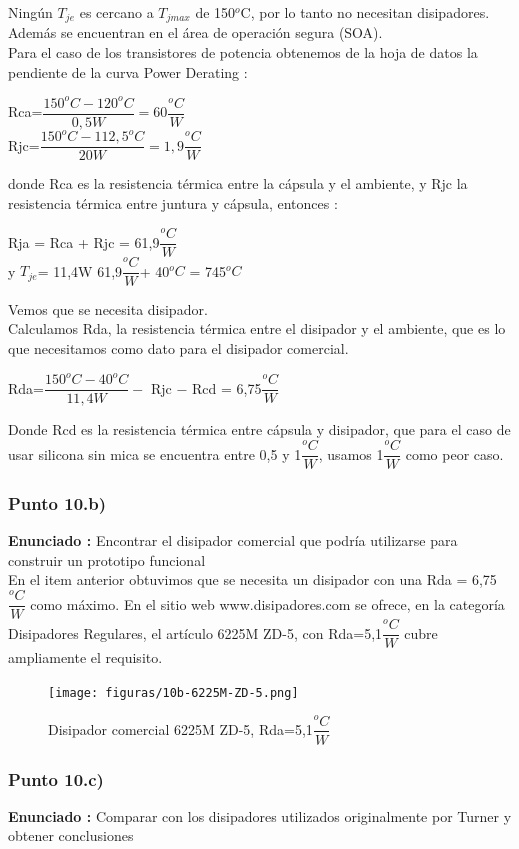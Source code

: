 \documentclass[12pt]{book}
\begin{document}
Ningún $T_{je}$ es cercano a $T_{jmax}$ de 150$^{o}$C, por lo tanto no necesitan disipadores. Además se encuentran en el área de operación segura (SOA).\\
Para el caso de los transistores de potencia obtenemos de la hoja de datos la pendiente de la curva Power Derating :
\begin{center}
Rca=$\dfrac{150^{o}C-120^{o}C}{0,5W}=60\dfrac{^{o}C}{W}$\\
Rjc=$\dfrac{150^{o}C-112,5^{o}C}{20W}=1,9\dfrac{^{o}C}{W}$
\end{center}
donde Rca es la resistencia térmica entre la cápsula y el ambiente, y Rjc la resistencia térmica entre juntura y cápsula, entonces :
\begin{center}
Rja = Rca + Rjc = 61,9$\dfrac{^{o}C}{W}$\\
y $T_{je}$= 11,4W 61,9$\dfrac{^{o}C}{W}$+ 40$^{o}C$ = 745$^{o}C$
\end{center}
Vemos que se necesita disipador.\\
Calculamos Rda, la resistencia térmica entre el disipador y el ambiente, que es lo que necesitamos como dato para el disipador comercial.
\begin{center}
Rda=$\dfrac{150^{o}C-40^{o}C}{11,4W}-$ Rjc $-$ Rcd = 6,75$\dfrac{^{o}C}{W}$
\end{center}
Donde Rcd es la resistencia térmica entre cápsula y disipador, que para el caso de usar silicona sin mica se encuentra entre 0,5 y 1$\dfrac{^{o}C}{W}$, usamos 1$\dfrac{^{o}C}{W}$ como peor caso.

\subsubsection{Punto 10.b)}
\textbf{Enunciado : } Encontrar el disipador comercial que podría utilizarse para construir un prototipo funcional\\[1cm]
En el item anterior obtuvimos que se necesita un disipador con una Rda = 6,75$\dfrac{^{o}C}{W}$ como máximo.
En el sitio web www.disipadores.com se ofrece, en la categoría Disipadores Regulares, el artículo 6225M ZD-5, con Rda=5,1$\dfrac{^{o}C}{W}$ cubre ampliamente el requisito.
\begin{figure}[H]
\centering
\texttt{[image: figuras/10b-6225M-ZD-5.png]}
\caption{Disipador comercial 6225M ZD-5, Rda=5,1$\dfrac{^{o}C}{W}$}
\label{figura10b}
\end{figure}

\subsubsection{Punto 10.c)}
\textbf{Enunciado : } Comparar con los disipadores utilizados originalmente por Turner y obtener conclusiones\\[1cm]
\end{document}
